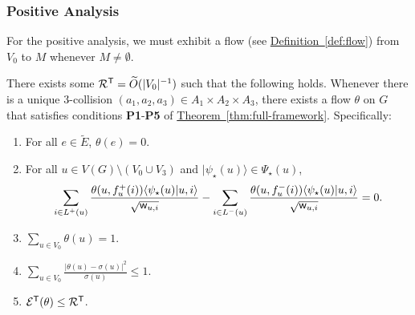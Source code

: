 \documentclass{article}
\newcommand{\thm}[1]{\hyperref[thm:#1]{Theorem~\ref*{thm:#1}}}
\newcommand{\defin}[1]{\hyperref[def:#1]{Definition~\ref*{def:#1}}}
\def\ket#1{{\lvert}#1\rangle}
\renewcommand{\>}{\rangle}
\newcommand{\<}{\langle}
\renewcommand{\(}{\left(}
\renewcommand{\)}{\right)}
\def\braket#1#2{{{\langle}#1\vert}#2\rangle}
\def\w{{\sf w}}
\begin{document}
\subsubsection{Positive Analysis}

For the positive analysis, we must exhibit a flow (see \defin{flow}) from $V_0$ to $M$ whenever $M\neq \emptyset$.

\begin{lemma}\label{lem:3-dist-positive}
There exists some ${\cal R}^{\sf T}=\widetilde{O}(|V_0|^{-1})$ such that the following holds. Whenever there is a unique $3$-collision $(a_1,a_2,a_3)\in A_1\times A_2\times A_3$, there exists a flow $\theta$ on $G$ that satisfies conditions \textbf{P1}-\textbf{P5} of \thm{full-framework}. Specifically:
\begin{enumerate}
	\item For all $e\in\tilde{E}$, $\theta(e)=0$.
	\item For all $u\in V(G)\setminus (V_0\cup V_3)$ and $\ket{\psi_\star(u)}\in \Psi_\star(u)$, 
$$\sum_{i\in L^+(u)}\frac{\theta(u,f^+_u(i))\braket{\psi_\star(u)}{u,i}}{\sqrt{\w_{u,i}}}-\sum_{i\in L^-(u)}\frac{\theta(u,f^-_u(i))\braket{\psi_\star(u)}{u,i}}{\sqrt{\w_{u,i}}}=0.$$
	\item $\sum_{u\in  V_0}\theta(u)=1$.
	\item $\sum_{u\in V_0}\frac{|\theta(u)-\sigma(u)|^2}{\sigma(u)}\leq 1$.
	\item ${\cal E}^{\sf T}(\theta)\leq {\cal R}^{\sf T}$.
\end{enumerate}
\end{lemma}
\end{document}
